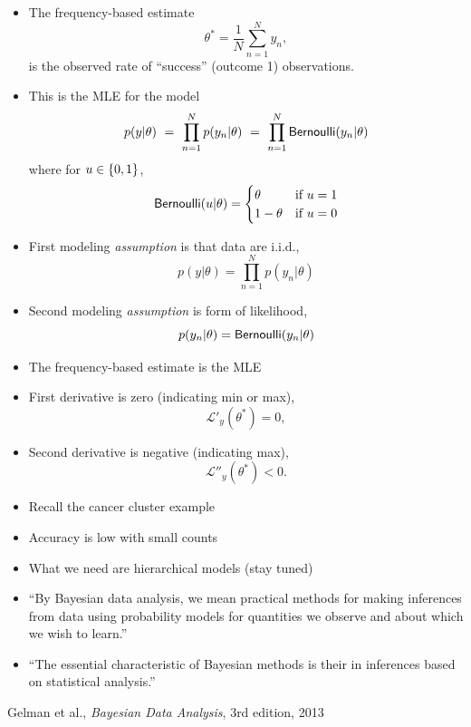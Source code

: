 \documentclass[10pt]{report}
\begin{document}
%
\begin{itemize}
\item The frequency-based estimate 
\[
\theta^{*} = \frac{1}{N} \sum_{n=1}^N y_n, 
\]
is the observed rate of ``success'' (outcome 1) observations.
\item This is the MLE for the model
\[
p(y|\theta) 
\ = \ \prod_{n=1}^N p(y_n|\theta) 
\ = \  \prod_{n=1}^N \text{\sf Bernoulli}(y_n|\theta) 
\]
where for $u \in \{ 0,1 \}$, 
{\small
\[
\text{\sf Bernoulli}(u|\theta) = 
\begin{cases}
\theta & \text{if } u = 1 
\\
1 - \theta & \text{if } u = 0
\end{cases}
\]
}
\end{itemize}

\vspace*{-4pt}
\begin{itemize}
\item First modeling \emph{assumption} is that data are i.i.d.,
\[
p(y|\theta) = \prod_{n=1}^N p(y_n|\theta)
\] 
\item Second modeling \emph{assumption} is form of likelihood,
\[
p(y_n|\theta) = \text{\sf Bernoulli}(y_n|\theta)
\]
\end{itemize}

\begin{itemize}
\item The frequency-based estimate is the MLE
\item First derivative is zero (indicating min or max),
\[
\mathcal{L}'_y(\theta^*) = 0,
\]
\item Second derivative is negative (indicating max),
\[
\mathcal{L}''_y(\theta^*) < 0.
\]
\end{itemize}

\begin{itemize}
\item Recall the cancer cluster example
\item Accuracy is low with small counts
\item What we need are hierarchical models (stay tuned)
\end{itemize}


\begin{itemize}
\item ``By {Bayesian data analysis}, we mean {practical methods}
  for making {inferences} from {data} using {probability models}
  for quantities we {observe} and about which we {wish to learn}.''
\item ``The essential characteristic of Bayesian methods is
  their 
  in inferences based on statistical analysis.''
\end{itemize}
% 
\vfill\hfill{\footnotesize Gelman et al., {\slshape Bayesian Data Analysis},
  3rd edition, 2013}
\end{document}
